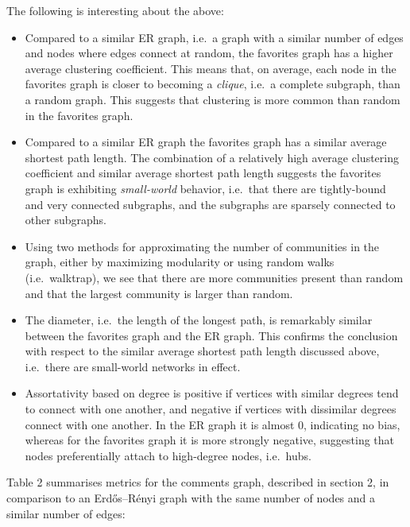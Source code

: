 The following is interesting about the above:

\begin{itemize}
\item
  Compared to a similar ER graph, i.e.~a graph with a similar number of
  edges and nodes where edges connect at random, the favorites graph has
  a higher average clustering coefficient. This means that, on average,
  each node in the favorites graph is closer to becoming a
  \emph{clique}, i.e.~a complete subgraph, than a random graph. This
  suggests that clustering is more common than random in the favorites
  graph.
\item
  Compared to a similar ER graph the favorites graph has a similar
  average shortest path length. The combination of a relatively high
  average clustering coefficient and similar average shortest path
  length suggests the favorites graph is exhibiting \emph{small-world}
  behavior, i.e.~that there are tightly-bound and very connected
  subgraphs, and the subgraphs are sparsely connected to other
  subgraphs.
\item
  Using two methods for approximating the number of communities in the
  graph, either by maximizing modularity or using random walks
  (i.e.~walktrap), we see that there are more communities present than
  random and that the largest community is larger than random.
\item
  The diameter, i.e.~the length of the longest path, is remarkably
  similar between the favorites graph and the ER graph. This confirms
  the conclusion with respect to the similar average shortest path
  length discussed above, i.e.~there are small-world networks in effect.
\item
  Assortativity based on degree is positive if vertices with similar
  degrees tend to connect with one another, and negative if vertices
  with dissimilar degrees connect with one another. In the ER graph it
  is almost 0, indicating no bias, whereas for the favorites graph it is
  more strongly negative, suggesting that nodes preferentially attach to
  high-degree nodes, i.e.~hubs.
\end{itemize}

Table 2 summarises metrics for the comments graph, described in section
2, in comparison to an Erdős--Rényi graph with the same number of nodes
and a similar number of edges:

